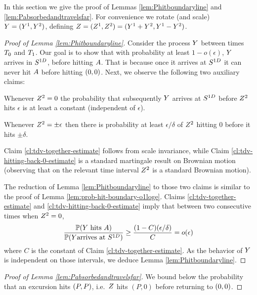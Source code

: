 {In this section we give the proof of Lemmas \ref{lem:Phitboundaryline} and
\ref{lem:Pabsorbedandtravelsfar}. For convenience we rotate (and scale)
$Y=(Y^1,Y^2)$, defining
$Z=(Z^1,Z^2)=(Y^1+Y^2,Y^1-Y^2)$.

\begin{proof}[Proof of Lemma \ref{lem:Phitboundaryline}]
Consider the process $Y$ between times $T_0$ and
$T_1$. Our goal is to show that with probability at least
$1-o(\epsilon)$, $Y$ arrives in $S^{1D}$, before hitting
$A$. That is because once it arrives at $S^{1D}$ it
can never hit $A$ before hitting $(0,0)$. Next, we observe the
following two auxiliary claims:

\begin{claim}\label{cl:tdv-together-estimate}
 Whenever $Z^2=0$ the probability that subsequently $Y$ arrives at $S^{1D}$ before $Z^2$ hits $\epsilon$ is at least a constant (independent of $\epsilon$).
\end{claim}

\begin{claim}\label{cl:tdv-hitting-back-0-estimate}
Whenever $Z^2=\pm\epsilon$ then there is probability at least $\epsilon/\delta$ of $Z^2$ hitting $0$ before it hits $\pm\delta$.
\end{claim}

Claim \ref{cl:tdv-together-estimate} follows from scale invariance, while
Claim \ref{cl:tdv-hitting-back-0-estimate} is a standard martingale result on
Brownian motion (observing that on the relevant time interval $Z^2$ is a
standard Brownian motion).

The reduction of Lemma \ref{lem:Phitboundaryline} to those two claims is
similar to the proof of Lemma \ref{lem:prob-hit-boundary-o1loge}. Claims
\ref{cl:tdv-together-estimate} and \ref{cl:tdv-hitting-back-0-estimate} imply
that between two consecutive times when $Z^2=0$,
\[ \frac{\mathbb{P}(Y\text{ hits }A)}{\mathbb{P}(Y\text{arrives at }S^{1D})}\ge\frac{(1-C)(\epsilon/\delta)}{C} =o(\epsilon)\]
where $C$ is the constant of Claim \ref{cl:tdv-together-estimate}. As the
behavior of $Y$ is independent on those intervals, we deduce Lemma
\ref{lem:Phitboundaryline}.
\end{proof}

\begin{proof}[Proof of Lemma \ref{lem:Pabsorbedandtravelsfar}]
We bound below the probability that an excursion hits $(P,P)$,
i.e.\ $Z$ hits $(P,0)$ before returning to $(0,0)$.


\end{proof}}
